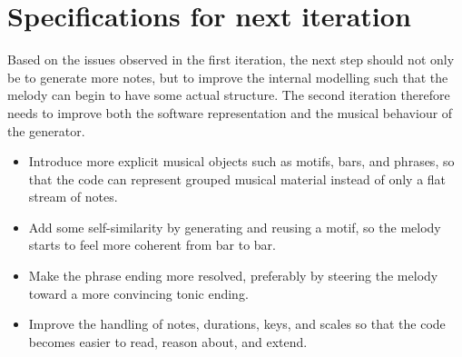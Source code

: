 \section{Specifications for next iteration}
  Based on the issues observed in the first iteration, the next step should not only be to generate more notes, but to improve the internal modelling such that the melody can begin to have some actual structure. The second iteration therefore needs to improve both the software representation and the musical behaviour of the generator.

  \begin{itemize}
    \item Introduce more explicit musical objects such as motifs, bars, and phrases, so that the code can represent grouped musical material instead of only a flat stream of notes.
    \item Add some self-similarity by generating and reusing a motif, so the melody starts to feel more coherent from bar to bar.
    \item Make the phrase ending more resolved, preferably by steering the melody toward a more convincing tonic ending.
    \item Improve the handling of notes, durations, keys, and scales so that the code becomes easier to read, reason about, and extend.
  \end{itemize}

